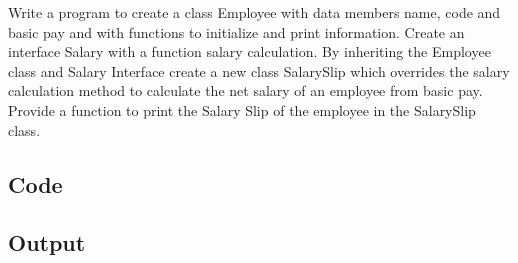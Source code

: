\documentclass[../main.tex]{subfiles}
\begin{document}
Write a program to create a class Employee with data members name, code and
basic pay and with functions to initialize and print information. Create an
interface Salary with a function salary calculation. By inheriting the Employee
class and Salary Interface create a new class SalarySlip which overrides the
salary calculation method to calculate the net salary of an employee from basic
pay. Provide a function to print the Salary Slip of the employee in the
SalarySlip class.

\subsection{Code}

\subsection{Output}
\end{document}
